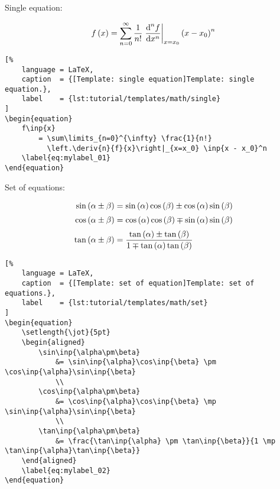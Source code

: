 
\noindent Single equation:

\begin{equation}
    f\left(x\right)
        = \sum\limits_{n=0}^{\infty} \frac{1}{n!}
          \left.\frac{\text{d}^{n}f}{\text{d}x^{n}}\right|_{x=x_0} \left(x - x_0\right)^n
    \label{eq:mylabel_01}
\end{equation}

\begin{lstlisting}[%
    language = LaTeX,
    caption  = {[Template: single equation]Template: single equation.},
    label    = {lst:tutorial/templates/math/single}
]
\begin{equation}
    f\inp{x}
        = \sum\limits_{n=0}^{\infty} \frac{1}{n!}
          \left.\deriv{n}{f}{x}\right|_{x=x_0} \inp{x - x_0}^n
    \label{eq:mylabel_01}
\end{equation}
\end{lstlisting}


\noindent Set of equations:

\begin{equation}
    \setlength{\jot}{5pt}
    \begin{aligned}
        \sin\inp{\alpha\pm\beta}
            &= \sin\inp{\alpha}\cos\inp{\beta} \pm \cos\inp{\alpha}\sin\inp{\beta}
            \\
        \cos\inp{\alpha\pm\beta}
            &= \cos\inp{\alpha}\cos\inp{\beta} \mp \sin\inp{\alpha}\sin\inp{\beta}
            \\
        \tan\inp{\alpha\pm\beta}
            &= \frac{\tan\inp{\alpha} \pm \tan\inp{\beta}}{1 \mp \tan\inp{\alpha}\tan\inp{\beta}}
    \end{aligned}
    \label{eq:mylabel_02}
\end{equation}

\begin{lstlisting}[%
    language = LaTeX,
    caption  = {[Template: set of equation]Template: set of equations.},
    label    = {lst:tutorial/templates/math/set}
]
\begin{equation}
    \setlength{\jot}{5pt}
    \begin{aligned}
        \sin\inp{\alpha\pm\beta}
            &= \sin\inp{\alpha}\cos\inp{\beta} \pm \cos\inp{\alpha}\sin\inp{\beta}
            \\
        \cos\inp{\alpha\pm\beta}
            &= \cos\inp{\alpha}\cos\inp{\beta} \mp \sin\inp{\alpha}\sin\inp{\beta}
            \\
        \tan\inp{\alpha\pm\beta}
            &= \frac{\tan\inp{\alpha} \pm \tan\inp{\beta}}{1 \mp \tan\inp{\alpha}\tan\inp{\beta}}
    \end{aligned}
    \label{eq:mylabel_02}
\end{equation}
\end{lstlisting}


